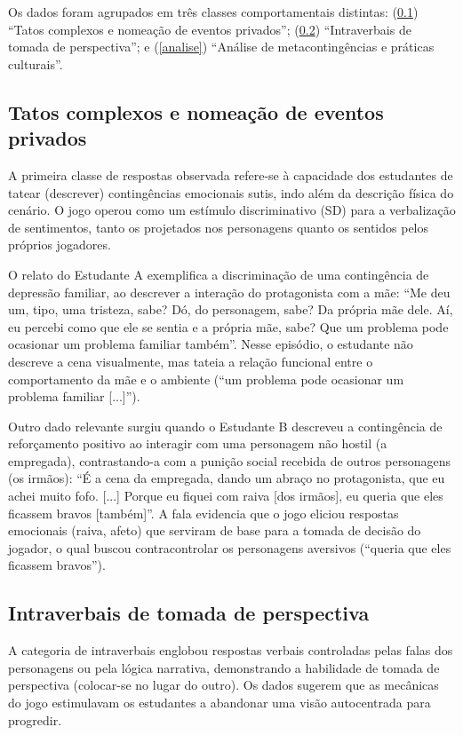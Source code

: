 \documentclass[portuguese]{textolivre}
\begin{document}
Os dados foram agrupados em três classes comportamentais distintas: (\ref{tatos}) “Tatos complexos e nomeação de eventos privados”; (\ref{intraverbais}) “Intraverbais de tomada de perspectiva”; e (\ref{analise}) “Análise de metacontingências e práticas culturais”.

\subsection{Tatos complexos e nomeação de eventos privados}\label{tatos}

A primeira classe de respostas observada refere-se à capacidade dos estudantes de tatear (descrever) contingências emocionais sutis, indo além da descrição física do cenário. O jogo operou como um estímulo discriminativo (SD) para a verbalização de sentimentos, tanto os projetados nos personagens quanto os sentidos pelos próprios jogadores.

O relato do Estudante A exemplifica a discriminação de uma contingência de depressão familiar, ao descrever a interação do protagonista com a mãe: “Me deu um, tipo, uma tristeza, sabe? Dó, do personagem, sabe? Da própria mãe dele. Aí, eu percebi como que ele se sentia e a própria mãe, sabe? Que um problema pode ocasionar um problema familiar também”. Nesse episódio, o estudante não descreve a cena visualmente, mas tateia a relação funcional entre o comportamento da mãe e o ambiente (“um problema pode ocasionar um problema familiar [...]”).

Outro dado relevante surgiu quando o Estudante B descreveu a contingência de reforçamento positivo ao interagir com uma personagem não hostil (a empregada), contrastando-a com a punição social recebida de outros personagens (os irmãos): “É a cena da empregada, dando um abraço no protagonista, que eu achei muito fofo. [...] Porque eu fiquei com raiva [dos irmãos], eu queria que eles ficassem bravos [também]”. A fala evidencia que o jogo eliciou respostas emocionais (raiva, afeto) que serviram de base para a tomada de decisão do jogador, o qual buscou contracontrolar os personagens aversivos (“queria que eles ficassem bravos”).

\subsection{Intraverbais de tomada de perspectiva}\label{intraverbais}
A categoria de intraverbais englobou respostas verbais controladas pelas falas dos personagens ou pela lógica narrativa, demonstrando a habilidade de tomada de perspectiva (colocar-se no lugar do outro). Os dados sugerem que as mecânicas do jogo estimulavam os estudantes a abandonar uma visão autocentrada para progredir.
\end{document}
